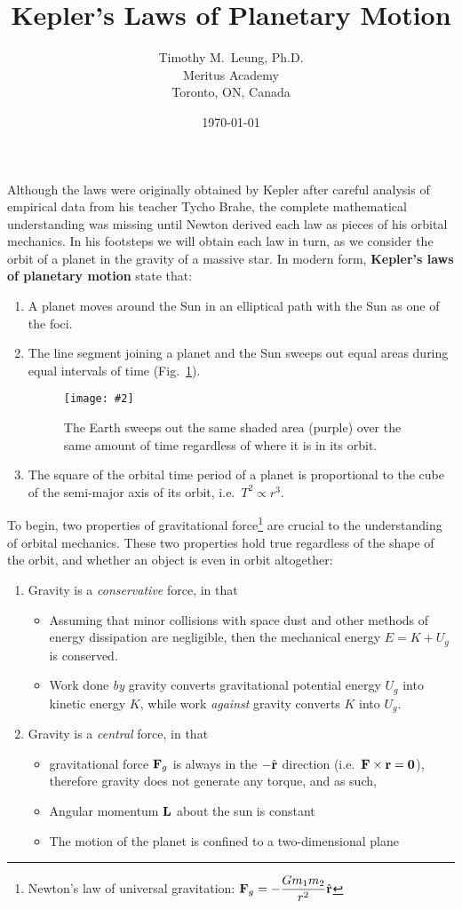\documentclass[11pt]{article}
\title{Kepler's Laws of Planetary Motion}
\author{Timothy M.\ Leung, Ph.D.\\
  Meritus Academy\\
  Toronto, ON, Canada}
\date{\today}
\newcommand{\pic}[2]{
  \texttt{[image: \#2]}
}
\newcommand{\mb}[1]{
  \ensuremath\mathbf{#1}
}
\begin{document}
\maketitle

Although the laws were originally obtained by Kepler after careful analysis of
empirical data from his teacher Tycho Brahe, the complete mathematical
understanding was missing until Newton derived each law as pieces of his
orbital mechanics. In his footsteps we will obtain each law in turn, as we
consider the orbit of a planet in the gravity of a massive star. In modern
form, \textbf{Kepler's laws of planetary motion} state that:
\begin{enumerate}[leftmargin=18pt]
\item A planet moves around the Sun in an elliptical path with the Sun as one
  of the foci.
\item The line segment joining a planet and the Sun sweeps out equal areas
  during equal intervals of time (Fig.~\ref{kep2}).
  \begin{figure}[t]
    \centering
    \pic{.4}{../201532-132212364-3243-planet.png}
    \caption{The Earth sweeps out the same shaded area (purple) over the
      same amount of time regardless of where it is in its orbit.}
    \label{kep2}
  \end{figure}
\item The square of the orbital time period of a planet is proportional to the
  cube of the semi-major axis of its orbit, i.e.\ $T^2\propto r^3$.
\end{enumerate}
To begin, two properties of gravitational force\footnote{Newton's law of
  universal gravitation:
  $\displaystyle \mb{F}_g=-\frac{Gm_1m_2}{r^2}\hat{\mb{r}}$} are crucial to the
understanding of orbital mechanics. These two properties hold true regardless
of the shape of the orbit, and whether an object is even in orbit altogether:
\begin{enumerate}[leftmargin=18pt]
\item Gravity is a \emph{conservative} force, in that
  \begin{itemize}[leftmargin=15pt]
  \item Assuming that minor collisions with space dust and other methods of
    energy dissipation are negligible, then the mechanical energy
    $E=K+U_g$ is conserved.
  \item Work done \emph{by} gravity converts gravitational potential energy
    $U_g$ into kinetic energy $K$, while work \emph{against} gravity converts
    $K$ into $U_g$.
  \end{itemize}
\item Gravity is a \emph{central} force, in that
  \begin{itemize}[leftmargin=15pt]
  \item gravitational force $\mb{F}_g$ is always in the $-\hat{\mb{r}}$
    direction (i.e.\ $\mb{F}\times\mb{r}=\mb{0}$), therefore gravity does not
    generate any torque, and as such,
  \item Angular momentum $\mb{L}$ about the sun is constant
  \item The motion of the planet is confined to a two-dimensional plane
  \end{itemize}
\end{enumerate}
\end{document}
